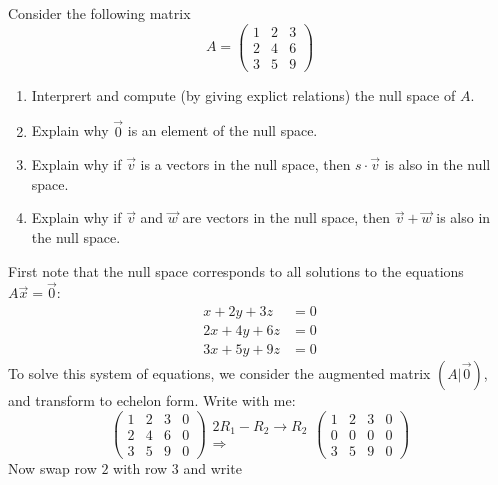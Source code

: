 \documentclass{ximera}
\begin{document}
\begin{example}
  Consider the following matrix
  \[
    A = \begin{pmatrix}
      1 & 2 & 3 \\
      2 & 4 & 6 \\
      3 & 5 & 9
    \end{pmatrix}
  \]
  \begin{enumerate}
    \item Interprert and compute (by giving explict relations) the null space
          of
          $A$.
    \item Explain why $\vec{0}$ is an element of the null space.
    \item Explain why if $\vec{v}$ is a vectors in the null space, then $s\cdot
            \vec{v}$ is also in the null space.
    \item Explain why if $\vec{v}$ and $\vec{w}$ are vectors in the null space,
          then $\vec{v} + \vec{w}$ is also in the null space.
  \end{enumerate}
  \begin{explanation}
    First note that the null space corresponds to all solutions to the
    equations
    $A\vec{x} = \vec{0}$:
    \begin{align*}
      x + 2y + 3z  & = 0 \\
      2x +4y + 6z  & = 0 \\
      3x + 5y + 9z & =0
    \end{align*}
    To solve this system of equations, we consider the augmented matrix
    $(A|\vec{0})$, and transform to echelon form. Write with me:
    \[
      \begin{pmatrix}
        1 & 2 & 3 & 0 \\
        2 & 4 & 6 & 0 \\
        3 & 5 & 9 & 0
      \end{pmatrix}
      \begin{matrix}	  \scriptstyle 2R_1-R_2\rightarrow R_2
        \\\Longrightarrow
      \end{matrix}
      \begin{pmatrix}
        1 & 2 & 3 & 0 \\
        0 & 0 & 0 & 0 \\
        3 & 5 & 9 & 0
      \end{pmatrix}
    \]
    Now swap row $2$ with row $3$ and write

  \end{explanation}
\end{example}
\end{document}
